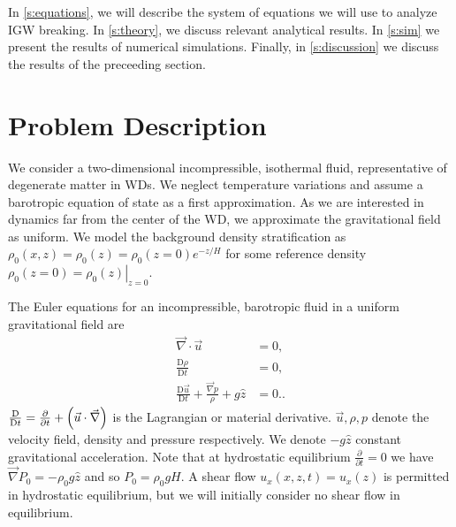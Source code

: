 \documentclass[twocolumn,
        nofootinbib, %
        usenames, %
        aps,
        prd,
        dvipsnames %
    ]{revtex4-1}%
\newcommand*{\pd}[2]{\frac{\partial#1}{\partial#2}}
\newcommand*{\md}[2]{\frac{\mathrm{D}#1}{\mathrm{D}#2}}
\newcommand*{\at}[1]{\left.#1\right|}
\DeclarePairedDelimiter\p{\lparen}{\rparen}
\begin{document}

In \autoref{s:equations}, we will describe the system of equations we will
use to analyze IGW breaking. In \autoref{s:theory}, we discuss relevant
analytical results. In \autoref{s:sim} we present the results of numerical
simulations. Finally, in \autoref{s:discussion} we discuss the results of the
preceeding section.

\section{Problem Description}\label{s:equations}

We consider a two-dimensional incompressible, isothermal fluid, representative
of degenerate matter in WDs. We neglect temperature variations and assume a
barotropic equation of state as a first approximation. As we are interested in
dynamics far from the center of the WD, we approximate the gravitational field
as uniform. We model the background density stratification as $\rho_0(x, z) =
\rho_0(z) = \rho_0(z=0) e^{-z/H}$ for some reference density $\rho_0(z=0) =
\at{\rho_0(z)}_{z = 0}$.

The Euler equations for an incompressible, barotropic fluid in a uniform
gravitational field are
\begin{subequations}\label{se:nl_orig}
    \begin{align}
        \vec{\nabla} \cdot \vec{u} &= 0,\\
        \md{\rho}{t} &= 0 ,\label{eq:nl_density}\\
        \md{\vec{u}}{t} + \frac{\vec{\nabla}p}{\rho} + g\hat{z} &=
            0.\label{eq:nl_mom}.
    \end{align}
\end{subequations}
$\md{}{t} = \pd{}{t} + \p*{\vec{u} \cdot \vec{\nabla}}$ is the Lagrangian or
material derivative. $\vec{u}, \rho, p$ denote the velocity field, density and
pressure respectively. We denote $-g\hat{z}$ constant gravitational
acceleration. Note that at hydrostatic equilibrium $\pd{}{t} = 0$ we have
$\vec{\nabla}P_0 = -\rho_0 g\hat{z}$ and so $P_0 = \rho_0 gH$. A shear flow
$u_x(x, z, t) = u_x(z)$ is permitted in hydrostatic equilibrium, but we will
initially consider no shear flow in equilibrium.
\end{document}
